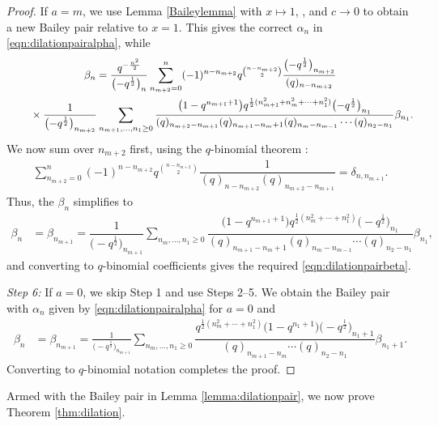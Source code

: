 \documentclass[pdftex]{sigma}
\numberwithin{equation}{section}
\begin{document}
\begin{proof}
If $a=m$, we use Lemma \ref{Baileylemma} with $x\mapsto 1$, , and $c\rightarrow 0$
to obtain a new Bailey pair relative to $x=1$. This gives the correct $\alpha_n$ in \eqref{eqn:dilationpairalpha}, while
\begin{gather*}
	\beta_n =
	\dfrac{q^{-\frac{n^2}{2}}}{\bigl(-q^{\frac{1}{2}}\bigr)_{n}}
	\sum_{n_{m+2}=0}^n (-1)^{n-n_{m+2}}q^{\binom{n-n_{m+2}}{2}}\dfrac{\bigl(-q^{\frac{1}{2}}\bigr)_{n_{m+2}}}{(q)_{n-n_{m+2}}}\notag\\ \hphantom{\beta_n =}{}
	\times \frac{1}{ \bigl(-q^{\frac{1}{2}}\bigr)_{n_{m+2}}}
	\sum_{n_{m+1},\dots,n_1\geq 0}
	\dfrac{\bigl(1-q^{n_{m+1}+1}\bigr)q^{\frac{1}{2}(n_{m+1}^2+n_{m}^2+\cdots+n_1^2)}\bigl(-q^{\frac{1}{2}}\bigr)_{n_1}}{(q)_{n_{m+2}-n_{m+1}}(q)_{n_{m+1}-n_{m}+1}
		(q)_{n_{m}-n_{m-1}}
		\cdots
		(q)_{n_{2}-n_{1}}} \beta_{n_1}.
\end{gather*}
We now sum over $n_{m+2}$ first, using the $q$-binomial theorem \cite[equation~(3.3.6)]{AndBook}:
\begin{align*}
	\sum_{n_{m+2}=0}^n (-1)^{n-n_{m+2}}q^{\binom{n-n_{m+2}}{2}}
	\dfrac{1}{(q)_{n-n_{m+2}}(q)_{n_{m+2}-n_{m+1}}}=
	\delta_{n,n_{m+1}}.
\end{align*}
Thus, the $\beta_n$ simplifies to
\begin{align*}
	\beta_n &{}= \beta_{n_{m+1}}=
	\dfrac{1}{\bigl(-q^{\frac{1}{2}}\bigr)_{n_{m+1}}}
	\sum_{n_{m},\dots,n_1\geq 0}
	\dfrac{\bigl(1-q^{n_{m+1}+1}\bigr)q^{\frac{1}{2}(n_{m}^2+\cdots+n_1^2)}\bigl(-q^{\frac{1}{2}}\bigr)_{n_1}}{(q)_{n_{m+1}-n_{m}+1}
		(q)_{n_{m}-n_{m-1}}
		\cdots
		(q)_{n_{2}-n_{1}}} \beta_{n_1},
\end{align*}
and converting to $q$-binomial coefficients gives the required \eqref{eqn:dilationpairbeta}.

{\it Step 6\emph{:}}
If $a=0$, we skip Step 1 and use Steps 2--5. We obtain the Bailey pair with $\alpha_n$ given by \eqref{eqn:dilationpairalpha} for $a=0$ and
\begin{align*}
	\beta_n &{}=\beta_{n_{m+1}}
	=
	\frac{1}{ \bigl(-q^{\frac{1}{2}}\bigr)_{n_{m+1}}}
	\sum_{n_{m},\dots,n_1\geq 0}
	\dfrac{q^{\frac{1}{2}(n_{m}^2+\cdots+n_1^2)}\bigl(1-q^{n_1+1}\bigr)\bigl(-q^{\frac{1}{2}}\bigr)_{n_1+1}}
	{(q)_{n_{m+1}-n_{m}}
		\cdots
		(q)_{n_{2}-n_{1}}} \beta_{n_1+1}.
\end{align*}
Converting to $q$-binomial notation completes the proof.
\end{proof}

Armed with the Bailey pair in Lemma \ref{lemma:dilationpair}, we now prove Theorem \ref{thm:dilation}.
\end{document}
